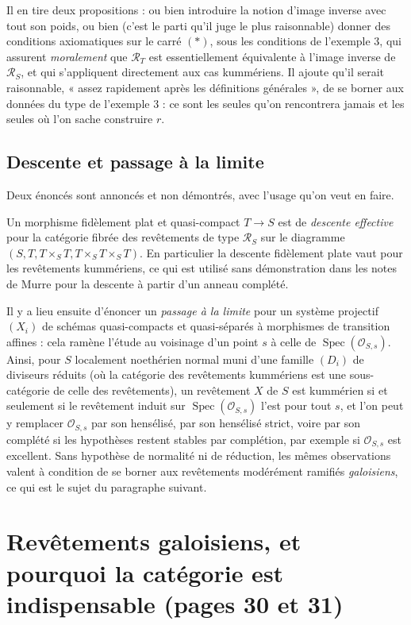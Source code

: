 \documentclass[11pt,a4paper]{article}
\begin{document}
Il en tire deux propositions : ou bien introduire la notion d'image inverse
avec tout son poids, ou bien (c'est le parti qu'il juge le plus raisonnable)
donner des conditions axiomatiques sur le carré $(\ast)$, sous les
conditions de l'exemple 3, qui assurent \emph{moralement} que
$\mathcal{R}_{T}$ est essentiellement équivalente à l'image inverse de
$\mathcal{R}_{S}$, et qui s'appliquent directement aux cas kummériens. Il
ajoute qu'il serait raisonnable, « assez rapidement après les définitions
générales », de se borner aux données du type de l'exemple 3 : ce sont les
seules qu'on rencontrera jamais et les seules où l'on sache construire $r$.

\subsection*{Descente et passage à la limite}

Deux énoncés sont annoncés et non démontrés, avec l'usage qu'on veut en faire.

Un morphisme fidèlement plat et quasi-compact $T \to S$ est de \emph{descente
effective} pour la catégorie fibrée des revêtements de type $\mathcal{R}_{S}$
sur le diagramme $(S, T, T\times_{S}T, T\times_{S}T\times_{S}T)$. En
particulier la descente fidèlement plate vaut pour les revêtements kummériens,
ce qui est utilisé sans démonstration dans les notes de Murre pour la descente
à partir d'un anneau complété.

Il y a lieu ensuite d'énoncer un \emph{passage à la limite} pour un système
projectif $(X_{i})$ de schémas quasi-compacts et quasi-séparés à morphismes de
transition affines : cela ramène l'étude au voisinage d'un point $s$ à celle de
$\operatorname{Spec}(\mathcal{O}_{S,s})$. Ainsi, pour $S$ localement noethérien
normal muni d'une famille $(D_{i})$ de diviseurs réduits (où la catégorie
des revêtements kummériens est une sous-catégorie de celle des revêtements),
un revêtement $X$ de $S$ est kummérien si et seulement si le revêtement induit
sur $\operatorname{Spec}(\mathcal{O}_{S,s})$ l'est pour tout $s$, et l'on peut
y remplacer $\mathcal{O}_{S,s}$ par son hensélisé, par son hensélisé strict,
voire par son complété si les hypothèses restent stables par complétion, par
exemple si $\mathcal{O}_{S,s}$ est excellent. Sans hypothèse de normalité ni de
réduction, les mêmes observations valent à condition de se borner aux
revêtements modérément ramifiés \emph{galoisiens}, ce qui est le sujet du
paragraphe suivant.

\section*{Revêtements galoisiens, et pourquoi la catégorie est indispensable (pages 30 et 31)}
\end{document}
